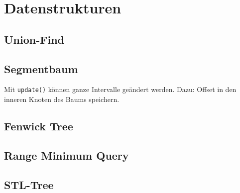 \section{Datenstrukturen}

\subsection{Union-Find}


\subsection{Segmentbaum}

Mit \lstinline{update()} können ganze Intervalle geändert werden.
Dazu: Offset in den inneren Knoten des Baums speichern.

\subsection{Fenwick Tree}



\subsection{Range Minimum Query}


\subsection{STL-Tree}

